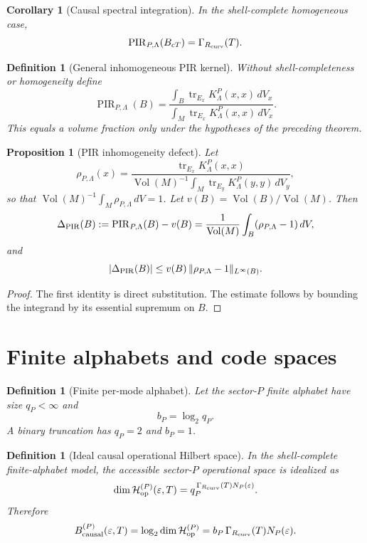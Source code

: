 \documentclass[11pt,a4paper]{article}
\newtheorem{proposition}[theorem]{Proposition}
\newtheorem{corollary}[theorem]{Corollary}
\newtheorem{definition}[theorem]{Definition}
\newcommand{\Vol}{\operatorname{Vol}}
\newcommand{\PIR}{\operatorname{PIR}}
\begin{document}
\begin{corollary}[Causal spectral integration]
In the shell-complete homogeneous case,
\[
\PIR_{P,\Lambda}(B_{cT})=\Gamma_{R_{\rm curv}}(T).
\]
\end{corollary}

\begin{definition}[General inhomogeneous PIR kernel]
Without shell-completeness or homogeneity define
\[
\PIR_{P,\Lambda}(B)=
\frac{\int_B\operatorname{tr}_{E_x}K^P_\Lambda(x,x)\,dV_x}
{\int_M\operatorname{tr}_{E_x}K^P_\Lambda(x,x)\,dV_x}.
\]
This equals a volume fraction only under the hypotheses of the preceding theorem.
\end{definition}

\begin{proposition}[PIR inhomogeneity defect]
Let
\[
\rho_{P,\Lambda}(x)=
\frac{\operatorname{tr}_{E_x}K^P_\Lambda(x,x)}
{\Vol(M)^{-1}\int_M\operatorname{tr}_{E_y}K^P_\Lambda(y,y)\,dV_y},
\]
so that $\Vol(M)^{-1}\int_M\rho_{P,\Lambda}\,dV=1$.  Let $v(B)=\Vol(B)/\Vol(M)$.  Then
\[
\Delta_{\rm PIR}(B):=\PIR_{P,\Lambda}(B)-v(B)
=
\frac{1}{\Vol(M)}\int_B(\rho_{P,\Lambda}-1)\,dV,
\]
and
\[
|\Delta_{\rm PIR}(B)|
\le
v(B)\,\|\rho_{P,\Lambda}-1\|_{L^\infty(B)}.
\]
\end{proposition}
\begin{proof}
The first identity is direct substitution.  The estimate follows by bounding the integrand by its essential supremum on $B$.
\end{proof}

\section{Finite alphabets and code spaces}

\begin{definition}[Finite per-mode alphabet]
Let the sector-$P$ finite alphabet have size $q_P<\infty$ and
\[
b_P=\log_2q_P.
\]
A binary truncation has $q_P=2$ and $b_P=1$.
\end{definition}

\begin{definition}[Ideal causal operational Hilbert space]
In the shell-complete finite-alphabet model, the accessible sector-$P$ operational space is idealized as
\[
\dim\mathcal H_{\rm op}^{(P)}(\varepsilon,T)
=
q_P^{\,\Gamma_{R_{\rm curv}}(T)N_P(\varepsilon)}.
\]
Therefore
\[
B_{\rm causal}^{(P)}(\varepsilon,T)
=
\log_2\dim\mathcal H_{\rm op}^{(P)}
=
b_P\,\Gamma_{R_{\rm curv}}(T)N_P(\varepsilon).
\]
\end{definition}
\end{document}
